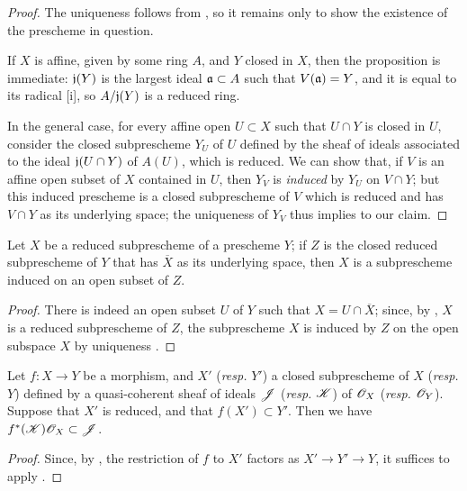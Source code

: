 \begin{proof}
\label{proof-1.5.2.1}
The uniqueness follows from , so it remains only to show the existence of the prescheme in question.

If $X$ is affine, given by some ring $A$, and $Y$ closed in $X$, then the proposition is immediate:
$\mathfrak{j}(Y)$ is the largest ideal $\mathfrak{a}\subset A$ such that $V(\mathfrak{a})=Y$, and it is equal to its radical [i], so $A/\mathfrak{j}(Y)$ is a reduced ring.

In the general case, for every affine open $U\subset X$ such that $U\cap Y$ is closed in $U$, consider the closed subprescheme $Y_U$ of $U$ defined by the sheaf of ideals associated to the ideal $\mathfrak{j}(U\cap Y)$ of $A(U)$, which is reduced.
We can show that, if $V$ is an affine open subset of $X$ contained in $U$, then $Y_V$ is \emph{induced} by $Y_U$ on $V\cap Y$;
but this induced prescheme is a closed subprescheme of $V$ which is reduced and has $V\cap Y$ as its underlying space;
the uniqueness of $Y_V$ thus implies to our claim.
\end{proof}

\begin{prop}[5.2.2]
\label{1.5.2.2}
Let $X$ be a reduced subprescheme of a prescheme $Y$; if $Z$ is the closed reduced subprescheme of $Y$ that has $\overline{X}$ as its underlying space, then $X$ is a subprescheme induced on an open subset of $Z$.
\end{prop}

\begin{proof}
\label{proof-1.5.2.2}
There is indeed an open subset $U$ of $Y$ such that $X=U\cap\overline{X}$;
since, by , $X$ is a reduced subprescheme of $Z$, the subprescheme $X$ is induced by $Z$ on the open subspace $X$ by uniqueness .
\end{proof}

\begin{cor}[5.2.4]
\label{1.5.2.4}
Let $f:X\to Y$ be a morphism, and $X'$ (\emph{resp.} $Y'$) a closed subprescheme of $X$ (\emph{resp.} $Y$) defined by a quasi-coherent sheaf of ideals $\mathscr{J}$ (\emph{resp.} $\mathscr{K}$) of $\mathscr{O}_X$ (\emph{resp.} $\mathscr{O}_Y$).
Suppose that $X'$ is reduced, and that $f(X')\subset Y'$.
Then we have $f^*(\mathscr{K})\mathscr{O}_X\subset\mathscr{J}$.
\end{cor}

\begin{proof}
\label{proof-1.5.2.4}
Since, by , the restriction of $f$ to $X'$ factors as $X'\to Y'\to Y$, it suffices to apply .
\end{proof}


